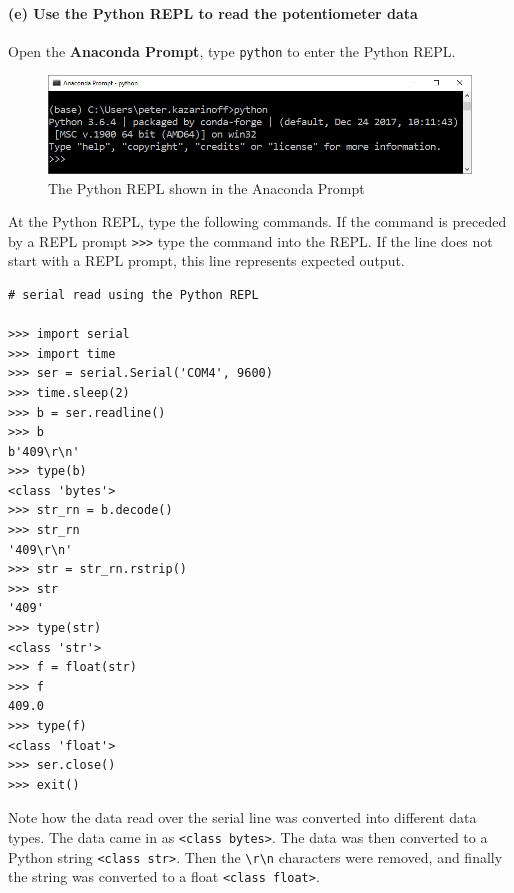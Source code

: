     \hypertarget{e-use-the-python-repl-to-read-the-potentiometer-data}{%
\paragraph{(e) Use the Python REPL to read the potentiometer
data}\label{e-use-the-python-repl-to-read-the-potentiometer-data}}

Open the \textbf{Anaconda Prompt}, type \texttt{python} to enter the
Python REPL.

\begin{figure}[h!]
\centering
\includegraphics{images/anaconda_prompt_python_REPL.png}
\caption{The Python REPL shown in the Anaconda Prompt}
\end{figure}

At the Python REPL, type the following commands. If the command is
preceded by a REPL prompt
\texttt{\textgreater{}\textgreater{}\textgreater{}} type the command
into the REPL. If the line does not start with a REPL prompt, this line
represents expected output.

\begin{verbatim}
# serial read using the Python REPL

>>> import serial
>>> import time
>>> ser = serial.Serial('COM4', 9600)
>>> time.sleep(2)
>>> b = ser.readline()
>>> b
b'409\r\n'
>>> type(b)
<class 'bytes'>
>>> str_rn = b.decode()
>>> str_rn
'409\r\n'
>>> str = str_rn.rstrip()
>>> str
'409'
>>> type(str)
<class 'str'>
>>> f = float(str)
>>> f
409.0
>>> type(f)
<class 'float'>
>>> ser.close()
>>> exit()
\end{verbatim}

Note how the data read over the serial line was converted into different
data types. The data came in as
\texttt{\textless{}class\ \textquotesingle{}bytes\textquotesingle{}\textgreater{}}.
The data was then converted to a Python string
\texttt{\textless{}class\ \textquotesingle{}str\textquotesingle{}\textgreater{}}.
Then the \texttt{\textbackslash{}r\textbackslash{}n} characters were
removed, and finally the string was converted to a float
\texttt{\textless{}class\ \textquotesingle{}float\textquotesingle{}\textgreater{}}.

